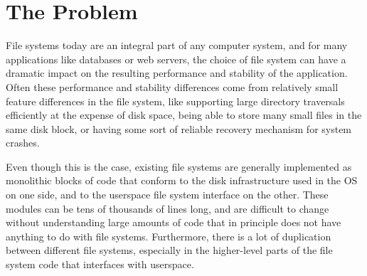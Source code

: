 \section{The Problem}
\label{sec:problem}

File systems today are an integral part of any computer system, and for many
applications like databases or web servers, the choice of file system can have a
dramatic impact on the resulting performance and stability of the application.
Often these performance and stability differences come from relatively small
feature differences in the file system, like supporting large directory
traversals efficiently at the expense of disk space, being able to store many
small files in the same disk block, or having some sort of reliable recovery
mechanism for system crashes.

Even though this is the case, existing file systems are generally implemented as
monolithic blocks of code that conform to the disk infrastructure used in the OS
on one side, and to the userspace file system interface on the other. These
modules can be tens of thousands of lines long, and are difficult to change
without understanding large amounts of code that in principle does not have
anything to do with file systems. Furthermore, there is a lot of duplication
between different file systems, especially in the higher-level parts of the file
system code that interfaces with userspace.

